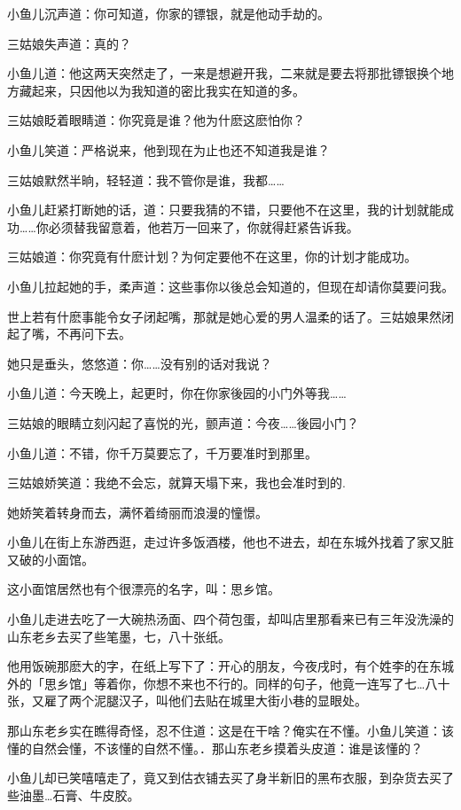 \documentclass[12pt,oneside]{book}
\begin{document}
小鱼儿沉声道：你可知道，你家的镖银，就是他动手劫的。

三姑娘失声道：真的？

小鱼儿道：他这两天突然走了，一来是想避开我，二来就是要去将那批镖银换个地方藏起来，只因他以为我知道的密比我实在知道的多。

三姑娘眨着眼睛道：你究竟是谁？他为什麽这麽怕你？

小鱼儿笑道：严格说来，他到现在为止也还不知道我是谁？

三姑娘默然半晌，轻轻道：我不管你是谁，我都\ldots\ldots{}

小鱼儿赶紧打断她的话，道：只要我猜的不错，只要他不在这里，我的计划就能成功\ldots\ldots 你必须替我留意着，他若万一回来了，你就得赶紧告诉我。

三姑娘道：你究竟有什麽计划？为何定要他不在这里，你的计划才能成功。

小鱼儿拉起她的手，柔声道：这些事你以後总会知道的，但现在却请你莫要问我。

世上若有什麽事能令女子闭起嘴，那就是她心爱的男人温柔的话了。三姑娘果然闭起了嘴，不再问下去。

她只是垂头，悠悠道：你\ldots\ldots 没有别的话对我说？

小鱼儿道：今天晚上，起更时，你在你家後园的小门外等我\ldots\ldots{}

三姑娘的眼睛立刻闪起了喜悦的光，颤声道：今夜\ldots\ldots 後园小门？

小鱼儿道：不错，你千万莫要忘了，千万要准时到那里。

三姑娘娇笑道：我绝不会忘，就算天塌下来，我也会准时到的.

她娇笑着转身而去，满怀着绮丽而浪漫的憧憬。

小鱼儿在街上东游西逛，走过许多饭酒楼，他也不进去，却在东城外找着了家又脏又破的小面馆。

这小面馆居然也有个很漂亮的名字，叫：思乡馆。

小鱼儿走进去吃了一大碗热汤面、四个荷包蛋，却叫店里那看来已有三年没洗澡的山东老乡去买了些笔墨，七，八十张纸。

他用饭碗那麽大的字，在纸上写下了：开心的朋友，今夜戌时，有个姓李的在东城外的「思乡馆」等着你，你想不来也不行的。同样的句子，他竟一连写了七\ldots 八十张，又雇了两个泥腿汉子，叫他们去贴在城里大街小巷的显眼处。

那山东老乡实在瞧得奇怪，忍不住道：这是在干啥？俺实在不懂。小鱼儿笑道：该懂的自然会懂，不该懂的自然不懂。．那山东老乡摸着头皮道：谁是该懂的？

小鱼儿却已笑嘻嘻走了，竟又到估衣铺去买了身半新旧的黑布衣服，到杂货去买了些油墨\ldots 石膏、牛皮胶。
\end{document}
